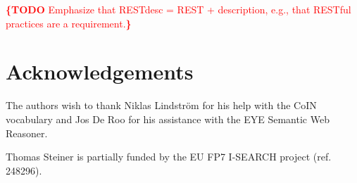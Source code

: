 \documentclass[runningheads,a4paper, twocolumn]{llncs}
\newcommand{\todo}[1]{\noindent\textcolor{red}{{\bf \{TODO} #1{\bf \}}}}
\begin{document}
\todo{Emphasize that RESTdesc = REST + description, e.g., that RESTful practices are a requirement.}




\section*{Acknowledgements} \label{sec:acknowledgements}
The authors wish to thank Niklas Lindstr\"om for his help with the CoIN vocabulary and Jos De Roo for his assistance with the EYE Semantic Web Reasoner.

{Thomas Steiner is partially funded by the EU FP7 I-SEARCH project (ref. 248296).}{}

\renewcommand{\ttdefault}{cmvtt}
\renewcommand\UrlFont\tt



\end{document}

